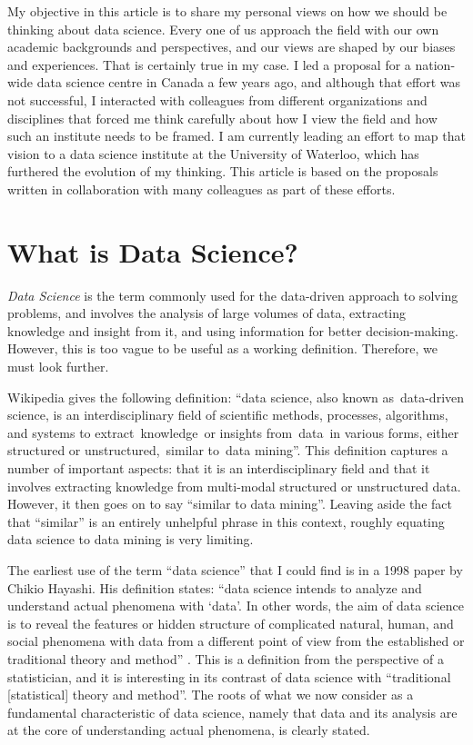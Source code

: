 \documentclass[11pt]{article}
\begin{document}
My objective in this article is to share my personal views on how we should be thinking about data science. Every one of us approach the field with our own academic backgrounds and perspectives, and our views are shaped by our biases and experiences. That is certainly true in my case. I led a proposal for a nation-wide data science centre in Canada a few years ago, and although that effort was not successful, I interacted with colleagues from different organizations and disciplines that forced me think carefully about how I view the field and how such an institute needs to be framed. I am currently leading an effort to map that vision to a data science institute at the University of Waterloo, which has furthered the evolution of my thinking. This article is based on the proposals written in collaboration with many colleagues as part of these efforts.

\section{What is Data Science?}

\emph{Data Science} is the term commonly used for the data-driven approach to solving problems, and involves the analysis of large volumes of data, extracting knowledge and insight from it, and using information for better decision-making. However, this is too vague to be useful as a working definition. Therefore, we must look further.

Wikipedia gives the following definition: ``data science, also known as data-driven science, is an interdisciplinary field of scientific methods, processes, algorithms, and systems to extract knowledge or insights from data in various forms, either structured or unstructured, similar to data mining''. This definition captures a number of important aspects: that it is an interdisciplinary field and that it involves extracting knowledge from multi-modal structured or unstructured data. However, it then goes on to say ``similar to data mining''. Leaving aside the fact that ``similar'' is an entirely unhelpful phrase in this context, roughly equating data science to data mining is very limiting.


The earliest use of the term ``data science'' that I could find is in a 1998 paper by Chikio Hayashi. His definition states: ``data science intends to analyze and understand actual phenomena with `data'. In other words, the aim of data science is to reveal the features or hidden structure of complicated natural, human, and social phenomena with data from a different point of view from the established or traditional theory and method'' \cite{Hayashi:1998aa}. This is a definition from the perspective of a statistician, and it is interesting in its contrast of data science with ``traditional [statistical] theory and method''. The roots of what we now consider as a fundamental characteristic of data science, namely that data and its analysis are at the core of understanding actual phenomena, is clearly stated.
\end{document}
